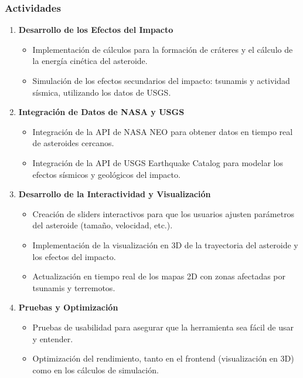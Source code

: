 \documentclass[conference]{IEEEtran}
\begin{document}
\subsubsection*{Actividades}
\begin{enumerate}
	\item \textbf{Desarrollo de los Efectos del Impacto}
	      \begin{itemize}
		      \item Implementación de cálculos para la formación de cráteres y el
		            cálculo de la energía cinética del asteroide.
		      \item Simulación de los efectos secundarios del impacto: tsunamis y
		            actividad sísmica, utilizando los datos de USGS.
	      \end{itemize}
	\item \textbf{Integración de Datos de NASA y USGS}
	      \begin{itemize}
		      \item Integración de la API de NASA NEO para obtener datos en
		            tiempo real de asteroides cercanos.
		      \item Integración de la API de USGS Earthquake Catalog para modelar
		            los efectos sísmicos y geológicos del impacto.
	      \end{itemize}
	\item \textbf{Desarrollo de la Interactividad y Visualización}
	      \begin{itemize}
		      \item Creación de sliders interactivos para que los usuarios ajusten
		            parámetros del asteroide (tamaño, velocidad, etc.).
		      \item Implementación de la visualización en 3D de la trayectoria del
		            asteroide y los efectos del impacto.
		      \item Actualización en tiempo real de los mapas 2D con zonas
		            afectadas por tsunamis y terremotos.
	      \end{itemize}
	\item \textbf{Pruebas y Optimización}
	      \begin{itemize}
		      \item Pruebas de usabilidad para asegurar que la herramienta sea
		            fácil de usar y entender.
		      \item Optimización del rendimiento, tanto en el frontend
		            (visualización en 3D) como en los cálculos de simulación.
	      \end{itemize}
\end{enumerate}
\end{document}
